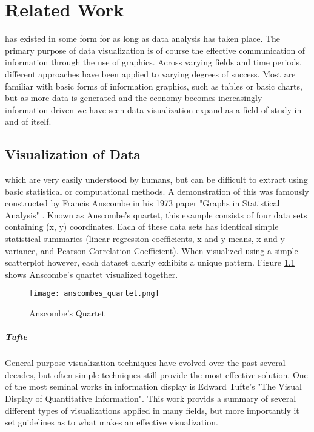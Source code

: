 \chapter{Related Work}
\label{sec:state_of_the_art}
 has existed in some form for as long as data analysis has taken place. The primary purpose of data visualization is of course the effective communication of information through the use of graphics. Across varying fields and time periods, different approaches have been applied to varying degrees of success. Most are familiar with basic forms of information graphics, such as tables or basic charts, but as more data is generated and the economy becomes increasingly information-driven we have seen data visualization expand as a field of study in and of itself. 
 
\section{Visualization of Data}
\label{sec:dataviz}
 which are very easily understood by humans, but can be difficult to extract using basic statistical or computational methods. A demonstration of this was famously constructed by Francis Anscombe in his 1973 paper "Graphs in Statistical Analysis" \cite{Anscombe1973}. Known as Anscombe's quartet, this example consists of four data sets containing (x, y) coordinates. Each of these data sets has identical simple statistical summaries (linear regression coefficients, x and y means, x and y variance, and Pearson Correlation Coefficient). When visualized using a simple scatterplot however, each dataset clearly exhibits a unique pattern. Figure \ref{fig:anscombe} shows Anscombe's quartet visualized together. 

\begin{figure}
	\centering
	\label{fig:anscombe}
	\texttt{[image: anscombes\_quartet.png]}
	\caption{Anscombe's Quartet \cite{Shoresh2012}}
\end{figure}

\paragraph{Tufte}
General purpose visualization techniques have evolved over the past several decades, but often simple techniques still provide the most effective solution. One of the most seminal works in information display is Edward Tufte's "The Visual Display of Quantitative Information"\cite{Tufle1983}. This work provids a summary of several different types of visualizations applied in many fields, but more importantly it set guidelines as to what makes an effective visualization.

